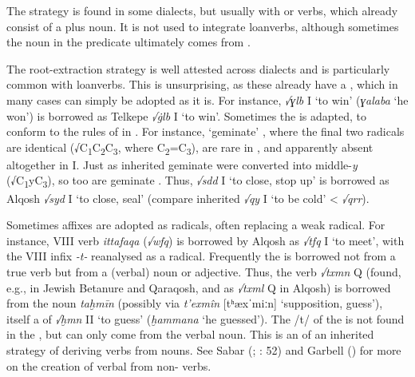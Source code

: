 \documentclass[output=paper]{langsci/langscibook}
\begin{document}
The  strategy is found in some  dialects, but usually with  or  verbs, which already consist of a  plus noun. It is not used to integrate  loanverbs, although sometimes the noun in the predicate ultimately comes from .

The root-extraction strategy is well attested across  dialects and is particularly common with  loanverbs. This is unsurprising, as these already have a , which in many cases can simply be adopted as it is. For instance,  \textit{√ɣlb} I ‘to win’ (\textit{ɣalaba} ‘he won’) is borrowed as  Telkepe \textit{√\.glb} I ‘to win’. Sometimes the  is adapted, to conform to the rules of   in . For instance, ‘geminate’ , where the final two radicals are identical (√C\textsubscript{1}C\textsubscript{2}C\textsubscript{3}, where C\textsubscript{2}=C\textsubscript{3}), are rare in , and apparently absent altogether in  I. Just as inherited geminate  were converted into middle-\textit{y}  (√C\textsubscript{1}yC\textsubscript{3}), so too are  geminate . Thus,  \textit{√sdd} I ‘to close, stop up’ is borrowed as  Alqosh \textit{√syd} I ‘to close, seal’ (compare inherited \textit{√qy{\R}} I ‘to be cold’ < \textit{√qrr}).

Sometimes  affixes are adopted as radicals, often replacing a weak radical. For instance,   VIII verb \textit{ittafaqa} (\textit{√wfq}) is borrowed by  Alqosh as \textit{√tfq} I ‘to meet’, with the VIII  infix \textit{\nobreakdash-t\nobreakdash-} reanalysed as a radical. Frequently the  is borrowed not from a true verb but from a (verbal) noun or adjective. Thus, the  verb \textit{√txmn} Q (found, e.g., in Jewish Betanure and  Qaraqosh, and as \textit{√txml} Q in Alqosh) is borrowed from the  noun \textit{taḫmīn} (possibly via   \textit{t’exmîn} [tʰæxˈmiːn] ‘supposition, guess’), itself a  of  \textit{√ḫmn} II ‘to guess’ (\textit{ḫammana} ‘he guessed’). The /t/ of the   is not found in the  , but can only come from the verbal noun. This is an  of an inherited  strategy of deriving verbs from nouns. See Sabar (\citeyear{Sabar1984}; \citeyear{Sabar2002}: 52) and Garbell (\citeyear[166]{Garbell1965}) for more on the creation of verbal  from non- verbs.
\end{document}
